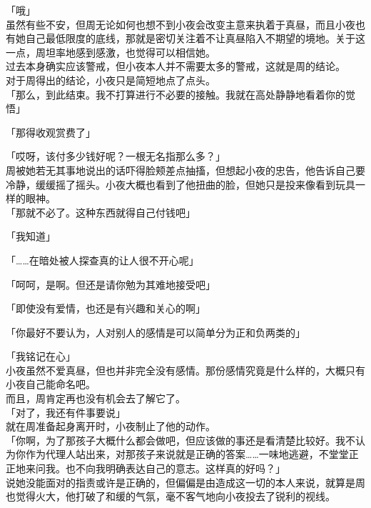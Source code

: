 「哦」\\

虽然有些不安，但周无论如何也想不到小夜会改变主意来执着于真昼，而且小夜也有她自己最低限度的底线，那就是密切关注着不让真昼陷入不期望的境地。关于这一点，周坦率地感到感激，也觉得可以相信她。\\

过去本身确实应该警戒，但小夜本人并不需要太多的警戒，这就是周的结论。\\

对于周得出的结论，小夜只是简短地点了点头。\\

「那么，到此结束。我不打算进行不必要的接触。我就在高处静静地看着你的觉悟」

「那得收观赏费了」

「哎呀，该付多少钱好呢？一根无名指那么多？」\\

周被她若无其事地说出的话吓得脸颊差点抽搐，但想起小夜的忠告，他告诉自己要冷静，缓缓摇了摇头。小夜大概也看到了他扭曲的脸，但她只是投来像看到玩具一样的眼神。\\

「那就不必了。这种东西就得自己付钱吧」

「我知道」

「……在暗处被人探查真的让人很不开心呢」

「呵呵，是啊。但还是请你勉为其难地接受吧」

「即使没有爱情，也还是有兴趣和关心的啊」

「你最好不要认为，人对别人的感情是可以简单分为正和负两类的」

「我铭记在心」\\

小夜虽然不爱真昼，但也并非完全没有感情。那份感情究竟是什么样的，大概只有小夜自己能命名吧。\\

而且，周肯定再也没有机会去了解它了。\\

「对了，我还有件事要说」\\

就在周准备起身离开时，小夜制止了他的动作。\\

「你啊，为了那孩子大概什么都会做吧，但应该做的事还是看清楚比较好。我不认为你作为代理人站出来，对那孩子来说就是正确的答案……一味地逃避，不堂堂正正地来问我。也不向我明确表达自己的意志。这样真的好吗？」\\

说她没能面对的指责或许是正确的，但偏偏是由造成这一切的本人来说，就算是周也觉得火大，他打破了和缓的气氛，毫不客气地向小夜投去了锐利的视线。\\

